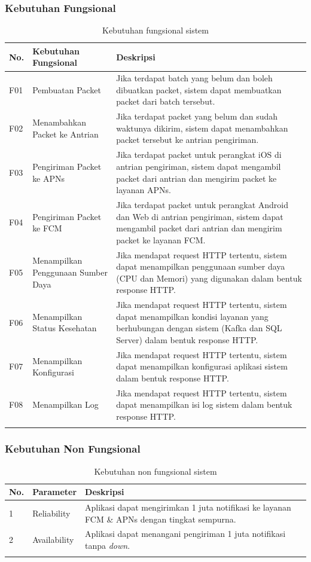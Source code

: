 \subsubsection{Kebutuhan Fungsional}
\begin{longtable}{|p{0.6cm}|p{3cm}|p{5cm}|}
    \hline
    \textbf{No.} & \textbf{Kebutuhan Fungsional} & \textbf{Deskripsi} \\ \hline
    F01 & Pembuatan Packet & Jika terdapat batch yang belum dan boleh dibuatkan packet, sistem dapat membuatkan packet dari batch tersebut. \\ \hline
    F02 & Menambahkan Packet ke Antrian & Jika terdapat packet yang belum dan sudah waktunya dikirim, sistem dapat menambahkan packet tersebut ke antrian pengiriman. \\ \hline
    F03 & Pengiriman Packet ke APNs & Jika terdapat packet untuk perangkat iOS di antrian pengiriman, sistem dapat mengambil packet dari antrian dan mengirim packet ke layanan APNs. \\ \hline
    F04 & Pengiriman Packet ke FCM & Jika terdapat packet untuk perangkat Android dan Web di antrian pengiriman, sistem dapat mengambil packet dari antrian dan mengirim packet ke layanan FCM. \\ \hline
    F05 & Menampilkan Penggunaan Sumber Daya & Jika mendapat request HTTP tertentu, sistem dapat menampilkan penggunaan sumber daya (CPU dan Memori) yang digunakan dalam bentuk response HTTP. \\ \hline
    F06 & Menampilkan Status Kesehatan & Jika mendapat request HTTP tertentu, sistem dapat menampilkan kondisi layanan yang berhubungan dengan sistem (Kafka dan SQL Server) dalam bentuk response HTTP. \\ \hline
    F07 & Menampilkan Konfigurasi & Jika mendapat request HTTP tertentu, sistem dapat menampilkan konfigurasi aplikasi sistem dalam bentuk response HTTP. \\ \hline
    F08 & Menampilkan Log & Jika mendapat request HTTP tertentu, sistem dapat menampilkan isi log sistem dalam bentuk response HTTP. \\ \hline
    \caption{Kebutuhan fungsional sistem}
\end{longtable}

\subsubsection{Kebutuhan Non Fungsional}
\begin{longtable}{|p{0.6cm}|p{2cm}|p{5.5cm}|}
    \hline
    \textbf{No.} & \textbf{Parameter} & \textbf{Deskripsi} \\ \hline
    1 & Reliability & Aplikasi dapat mengirimkan 1 juta notifikasi ke layanan FCM \& APNs dengan tingkat sempurna. \\ \hline
    2 & Availability & Aplikasi dapat menangani pengiriman 1 juta notifikasi tanpa \textit{down}. \\ \hline
    \caption{Kebutuhan non fungsional sistem}
\end{longtable}

